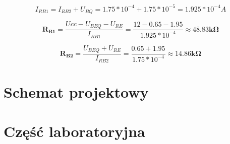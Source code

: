 \documentclass[a4paper,12pt]{article}
\begin{document}
\begin{itemize}
\begin{equation}
I_{RB1} = I_{RB2} + U_{BQ} = 1.75*10^{-4} + 1.75*10^{-5} = 1.925*10^{-4}A
\end{equation}

\begin{equation}
\mathbf{R_{B1}} = \frac{Ucc - U_{BEQ} - U_{RE}}{I_{RB1}} = \frac{12 - 0.65 - 1.95}{ 1.925*10^{-4}} \approx \mathbf{48.83k\Omega}
\end{equation}

\begin{equation}
\mathbf{R_{B2}} = \frac{U_{BEQ} + U_{RE}}{I_{RB2}} = \frac{0.65 + 1.95}{1.75*10^{-4}} \approx \mathbf{14.86k\Omega}
\end{equation}

\end{itemize}

\section {Schemat projektowy}


\pagebreak
\section{Część laboratoryjna}
\end{document}
